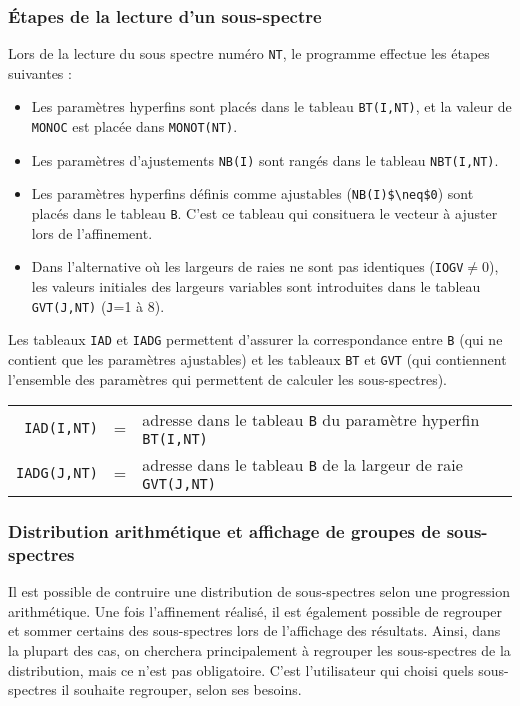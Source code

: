 \subsubsection{\'Etapes de la lecture d'un sous-spectre}
Lors de la lecture du sous spectre numéro \lstinline{NT}, le programme effectue les étapes suivantes :
\begin{itemize}
  \item Les paramètres hyperfins sont placés dans le tableau \lstinline{BT(I,NT)}, et la valeur de \lstinline{MONOC} est placée dans \lstinline{MONOT(NT)}.
  \item Les paramètres d'ajustements \lstinline{NB(I)} sont rangés dans le tableau \lstinline{NBT(I,NT)}.
  \item Les paramètres hyperfins définis comme ajustables (\lstinline{NB(I)$\neq$0}) sont placés dans le tableau \lstinline{B}.
   C'est ce tableau qui consituera le vecteur à ajuster lors de l'affinement.
  \item Dans l'alternative où les largeurs de raies ne sont pas identiques (\lstinline{IOGV}$\neq$0), les valeurs initiales des largeurs variables sont introduites dans le tableau \lstinline{GVT(J,NT)} (\lstinline{J}=1 à 8). 
\end{itemize}

Les tableaux \lstinline{IAD} et \lstinline{IADG} permettent d'assurer la correspondance entre \lstinline{B} 
(qui ne contient que les paramètres ajustables) et les tableaux \lstinline{BT} et \lstinline{GVT} (qui contiennent l'ensemble des paramètres qui permettent de calculer les sous-spectres).

\begin{tabular}{rcl}
  \lstinline{IAD(I,NT)}&=&adresse dans le tableau \lstinline{B}  du paramètre  hyperfin \lstinline{BT(I,NT)}\\
  \lstinline{IADG(J,NT)}&=&adresse dans le tableau \lstinline{B} de la largeur de raie \lstinline{GVT(J,NT)}\\
\end{tabular}
\subsubsection{Distribution arithmétique et affichage de groupes de sous-spectres}
Il est possible de contruire une distribution de sous-spectres selon une progression arithmétique.
Une fois l'affinement réalisé, il est également possible de regrouper et sommer certains des sous-spectres lors de l'affichage des résultats. 
Ainsi, dans la plupart des cas, on cherchera principalement à regrouper les sous-spectres de la distribution, mais ce n'est pas obligatoire.
C'est l'utilisateur qui choisi quels sous-spectres il souhaite regrouper, selon ses besoins.

